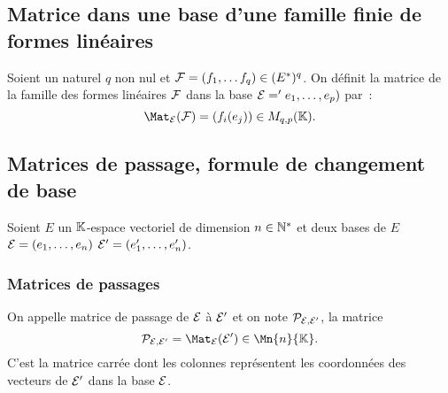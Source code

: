 \subsection{Matrice dans une base d'une famille finie de formes linéaires}

Soient un naturel $q$ non nul et $\mathcal{F}=(f_1, \ldots f_q) \in (E^*)^q$. On définit la matrice de la famille des formes linéaires $\mathcal{F}$ dans la base $\mathcal{E}='e_1, \ldots, e_p)$ par~:
\begin{equation}
  \Mat_\E(\F) = (f_i(e_j)) \in M_{q,p}(\K).
\end{equation}

\subsection{Matrices de passage, formule de changement de base}

Soient $E$ un $\mathbb{K}$-espace vectoriel de dimension $n \in \mathbb{N}^*$ et deux bases de $E$ $\mathcal{E}=(e_1, \ldots, e_n)$ $\mathcal{E}'=(e'_1, \ldots, e'_n)$. 

\subsubsection{Matrices de passages}

\begin{defdef} 
  On appelle matrice de passage de $\mathcal{E}$ à $\mathcal{E}'$ et on note $\mathcal{P}_{\mathcal{E},\mathcal{E}'}$, la matrice
  \begin{equation}
    \P_{\E,\E'} = \Mat_\E(\E') \in \Mn{n}{\K}.
  \end{equation}
  C'est la matrice carrée dont les colonnes représentent les coordonnées des vecteurs de $\mathcal{E}'$ dans la base $\mathcal{E}$.
\end{defdef}

